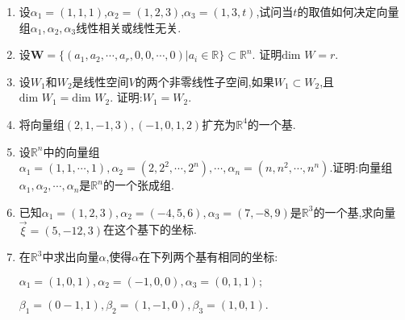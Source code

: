 \documentclass{ctexart}
\begin{document}
\begin{enumerate}
    \vspace*{60pt}
    
    \item 设$\alpha_1=(1,1,1)$,$\alpha_2=(1,2,3)$,$\alpha_3=(1,3,t)$,试问当$t$的取值如何决定向量组$\alpha_1,\alpha_2,\alpha_3$线性相关或线性无关.\\
    
    \newpage
    
    \item 设$\mathbf{W}=\{(a_1,a_2,\cdots,a_r,0,0,\cdots,0)|a_i\in \mathbb{R}\}\subset \mathbb{R}^n$. 证明$\mbox{dim }W=r$.\\
    
    \vspace*{80pt}
    
    \item 设$W_1$和$W_2$是线性空间$V$的两个非零线性子空间,如果$W_1\subset W_2$,且$\mbox{dim }W_1=\mbox{dim }W_2$. 证明:$W_1=W_2$.\\
    
    \vspace*{80pt}
    
    \item 将向量组$(2,1,-1,3),(-1,0,1,2)$扩充为$\mathbb{R}^4$的一个基.\\
    
    \vspace*{70pt}
    
    \item 设$\mathbb{R}^n$中的向量组$\alpha_1=(1,1,\cdots,1),\alpha_2=(2,2^2,\cdots,2^n),\cdots,\alpha_n=(n,n^2,\cdots,n^n)$.证明:向量组$\alpha_1,\alpha_2,\cdots,\alpha_n$是$\mathbb{R}^n$的一个张成组.\\
    
    \vspace*{70pt}
    
    \item 已知$\alpha_1=(1,2,3),\alpha_2=(-4,5,6),\alpha_3=(7,-8,9)$是$\mathbb{R}^3$的一个基,求向量$\vec{\xi}=(5,-12,3)$在这个基下的坐标.\\
    
    \newpage

    \item 在$\mathbb{R}^3$中求出向量$\alpha$,使得$\alpha$在下列两个基有相同的坐标:
    
    $\alpha_1=(1,0,1),\alpha_2=(-1,0,0),\alpha_3=(0,1,1);$
    
    $\beta_1=(0-1,1),\beta_2=(1,-1,0),\beta_3=(1,0,1).$\\
    


\end{enumerate}
\end{document}

